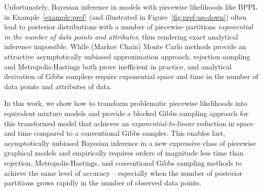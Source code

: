 Unfortunately, Bayesian inference in models with piecewise likelihoods
like BPPL in Example~\ref{example:pref} (and illustrated in
Figure~\ref{fig:pref-up-down}) often lead to posterior distributions
with a number of piecewise partitions \emph{exponential in the number
  of data points and attributes}, thus rendering exact analytical
inference impossible.  While (Markov Chain) Monte Carlo methods
provide an attractive asymptotically unbiased approximation approach,
rejection sampling and Metropolis-Hastings both prove inefficient in
practice, and analytical derivation of Gibbs samplers require
exponential space and time in the number of data points and attributes
of data.


In this work, we show how to transform problematic
piecewise likelihoods into equivalent mixture models and provide
a blocked Gibbs sampling approach for this transformed model that
achieves an \emph{exponential-to-linear} reduction in space and time compared
to a conventional Gibbs sampler.  This enables fast, asymptotically
unbiased Bayesian inference in a new expressive class of piecewise graphical
models and empirically requires orders of magnitude less time than
rejection, Metropolis-Hastings, and conventional Gibbs sampling
methods to achieve the same level of accuracy -- especially
when the number of posterior partitions grows rapidly in the number of observed data points.

%

